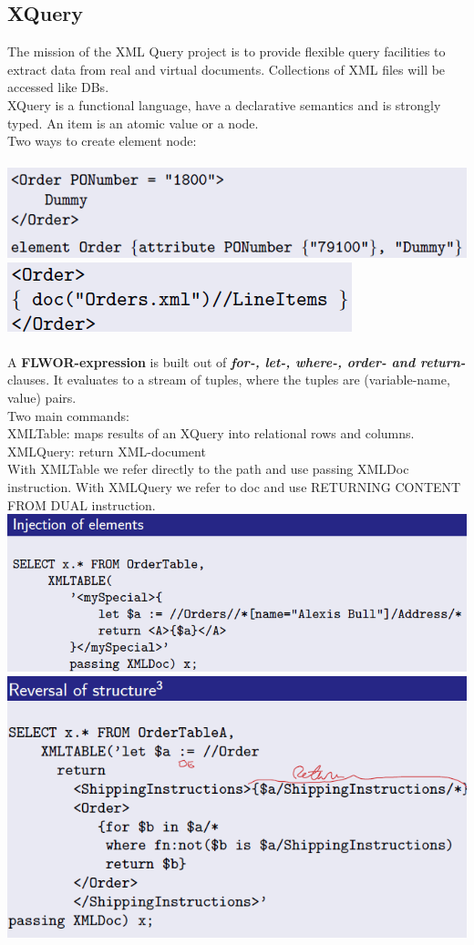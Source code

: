 \documentclass{article}
\begin{document}
\subsection{XQuery}
The mission of the XML Query project is to provide flexible query facilities to
extract data from real and virtual documents. Collections of XML files will be accessed like DBs.\\
XQuery is a functional language, have a declarative semantics and is strongly typed. An item is an atomic value or a node.\\
Two ways to create element node:\\\\
\includegraphics[scale=0.65]{5.png}
\includegraphics[scale=0.65]{6.png}\\\\
A \textbf{FLWOR-expression} is built out of \textbf{\textit{for-, let-, where-, order- and
return-}}clauses. It evaluates to a stream of tuples, where the tuples are
(variable-name, value) pairs.\\
Two main commands:\\
XMLTable: maps results of an XQuery into relational rows and columns.\\
XMLQuery: return XML-document\\
With XMLTable we refer directly to the path and use passing XMLDoc instruction. With XMLQuery we refer to doc and use RETURNING CONTENT FROM DUAL instruction.\\
\includegraphics[scale=0.5]{7.png}
\includegraphics[scale=0.5]{8.png}\\
\end{document}

